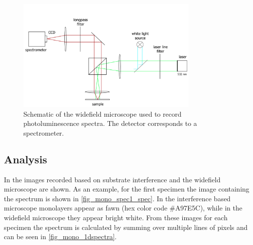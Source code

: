 \begin{figure}[!ht]
    \centering
    \includegraphics[width=0.8\textwidth]{img/setup1.png}
    \caption{Schematic of the widefield microscope used to record photoluminescence spectra. The detector corresponds to a spectrometer.}
    \label{fig_widefield}
\end{figure}


\subsection{Analysis}

In  the images recorded based on substrate interference and the widefield microscope are shown.
As an example, for the first specimen the image containing the spectrum is shown in \cref{fig_mono_spec1_spec}.
In the interference based microscope monolayers appear as fawn (hex color code \#A97E5C), while in the widefield microscope they appear bright white.
From these images for each specimen the spectrum is calculated by summing over multiple lines of pixels and can be seen in \cref{fig_mono_1dspectra}.

